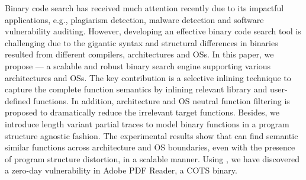 



Binary code search has received much attention recently due to its impactful applications,
e.g., plagiarism detection, malware detection and software vulnerability auditing.
However, developing an effective binary code search tool is challenging due to the gigantic syntax and structural differences in binaries resulted from different compilers, architectures and OSs.
In this paper, we propose \tool --- a scalable and robust binary search engine supporting various architectures and OSs.
The key contribution is a selective inlining technique to capture the complete function semantics by inlining relevant library and user-defined functions.
In addition, architecture and OS neutral function filtering is proposed to dramatically reduce the irrelevant target functions.
Besides, we introduce length variant partial traces to model binary functions in a program structure agnostic fashion.
The experimental results show that \tool can find semantic similar functions across architecture and OS boundaries, even with the presence of program structure distortion, in a scalable manner. Using \tool, we have discovered a zero-day vulnerability in Adobe PDF Reader, a COTS binary.
